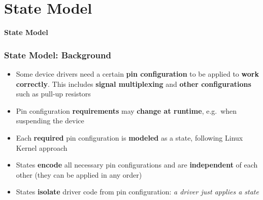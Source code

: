 \documentclass[handout]{beamer}
\begin{document}
\section{State Model}

\begin{frame}
  \begin{center}
    \Huge \textbf{State Model}
  \end{center}
\end{frame}

\begin{frame}
  \frametitle{State Model: Background}

  \begin{itemize}
    \item<1-> Some device drivers need a certain \textbf{pin configuration} to
          be applied to \textbf{work correctly}. This includes
          \textbf{signal multiplexing} and \textbf{other configurations} such as
          pull-up resistors
    \item<2-> Pin configuration \textbf{requirements} may
          \textbf{change at runtime}, e.g.\ when suspending the device
    \item<3-> Each \textbf{required} pin configuration is \textbf{modeled} as a
          state, following Linux Kernel approach
    \item<4-> States \textbf{encode} all necessary pin configurations and are
          \textbf{independent} of each other (they can be applied in any order)
    \item<5-> States \textbf{isolate} driver code from pin configuration:
          \textit{a driver just applies a state}
  \end{itemize}
\end{frame}
\end{document}
